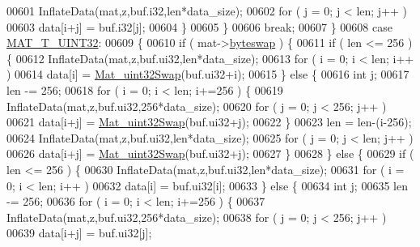 \begin{DoxyCode}
00601                     InflateData(mat,z,buf.i32,len*data\_size);
00602                     \textcolor{keywordflow}{for} ( j = 0; j < len; j++ )
00603                         data[i+j] = buf.i32[j];
00604                 \}
00605             \}
00606             \textcolor{keywordflow}{break};
00607         \}
00608         \textcolor{keywordflow}{case} \hyperlink{group___m_a_t_ggacf7b3b879282b7ab3a51190e49bf3453aa397e285a23fe240368b752897652c6a}{MAT\_T\_UINT32}:
00609         \{
00610             \textcolor{keywordflow}{if} ( mat->\hyperlink{struct__mat__t_a99d207977af5e04941ace56d71817a40}{byteswap} ) \{
00611                 \textcolor{keywordflow}{if} ( len <= 256 )\{
00612                     InflateData(mat,z,buf.ui32,len*data\_size);
00613                     \textcolor{keywordflow}{for} ( i = 0; i < len; i++ )
00614                         data[i] = \hyperlink{endian_8c_a8cb0d0750e2eaf9840d95db531934f4f}{Mat\_uint32Swap}(buf.ui32+i);
00615                 \} \textcolor{keywordflow}{else} \{
00616                     \textcolor{keywordtype}{int} j;
00617                     len -= 256;
00618                     \textcolor{keywordflow}{for} ( i = 0; i < len; i+=256 ) \{
00619                         InflateData(mat,z,buf.ui32,256*data\_size);
00620                         \textcolor{keywordflow}{for} ( j = 0; j < 256; j++ )
00621                             data[i+j] = \hyperlink{endian_8c_a8cb0d0750e2eaf9840d95db531934f4f}{Mat\_uint32Swap}(buf.ui32+j);
00622                     \}
00623                     len = len-(i-256);
00624                     InflateData(mat,z,buf.ui32,len*data\_size);
00625                     \textcolor{keywordflow}{for} ( j = 0; j < len; j++ )
00626                         data[i+j] = \hyperlink{endian_8c_a8cb0d0750e2eaf9840d95db531934f4f}{Mat\_uint32Swap}(buf.ui32+j);
00627                 \}
00628             \} \textcolor{keywordflow}{else} \{
00629                 \textcolor{keywordflow}{if} ( len <= 256 ) \{
00630                     InflateData(mat,z,buf.ui32,len*data\_size);
00631                     \textcolor{keywordflow}{for} ( i = 0; i < len; i++ )
00632                         data[i] = buf.ui32[i];
00633                 \} \textcolor{keywordflow}{else} \{
00634                     \textcolor{keywordtype}{int} j;
00635                     len -= 256;
00636                     \textcolor{keywordflow}{for} ( i = 0; i < len; i+=256 ) \{
00637                         InflateData(mat,z,buf.ui32,256*data\_size);
00638                         \textcolor{keywordflow}{for} ( j = 0; j < 256; j++ )
00639                             data[i+j] = buf.ui32[j];

\end{DoxyCode}
